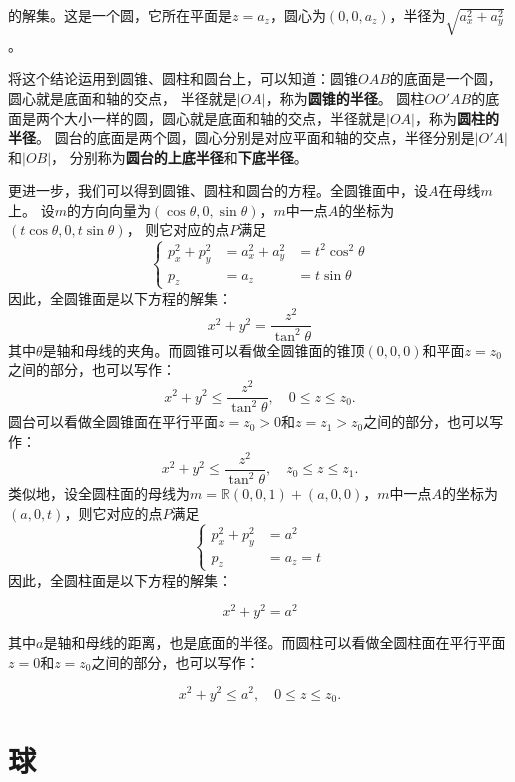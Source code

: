 \documentclass[12pt,UTF8]{ctexbook}
\begin{document}
的解集。这是一个圆，它所在平面是$z=a_z$，圆心为$(0,0,a_z)$，半径为$\sqrt{a_x^2+a_y^2}$。

将这个结论运用到圆锥、圆柱和圆台上，可以知道：圆锥$OAB$的底面是一个圆，圆心就是底面和轴的交点，
半径就是$|OA|$，称为\textbf{圆锥的半径}。
圆柱$OO'AB$的底面是两个大小一样的圆，圆心就是底面和轴的交点，半径就是$|OA|$，称为\textbf{圆柱的半径}。
圆台的底面是两个圆，圆心分别是对应平面和轴的交点，半径分别是$|O'A|$和$|OB|$，
分别称为\textbf{圆台的上底半径}和\textbf{下底半径}。

更进一步，我们可以得到圆锥、圆柱和圆台的方程。全圆锥面中，设$A$在母线$m$上。
设$m$的方向向量为$(\cos{\theta}, 0, \sin{\theta})$，$m$中一点$A$的坐标为$(t\cos{\theta}, 0, t\sin{\theta})$，
则它对应的点$P$满足
$$
\left\{
\begin{array}{rll}
    p_x^2+p_y^2 &= a_x^2+a_y^2 &= t^2\cos^2{\theta} \\
    p_z &= a_z &= t\sin{\theta}
\end{array}
\right.
$$
因此，全圆锥面是以下方程的解集：
$$ x^2 + y^2 = \frac{z^2}{\tan^2{\theta}}$$
其中$\theta$是轴和母线的夹角。而圆锥可以看做全圆锥面的锥顶$( 0,0,0)$和平面$z=z_0$之间的部分，也可以写作：
$$ x^2 + y^2 \leqslant \frac{z^2}{\tan^2{\theta}} , \quad 0\leqslant z \leqslant z_0.$$
圆台可以看做全圆锥面在平行平面$z=z_0>0$和$z=z_1 > z_0$之间的部分，也可以写作：
$$ x^2 + y^2 \leqslant \frac{z^2}{\tan^2{\theta}} , \quad z_0\leqslant z \leqslant z_1.$$
类似地，设全圆柱面的母线为$m = \mathbb{R}(0,0,1)+(a,0,0)$，$m$中一点$A$的坐标为$(a, 0, t)$，则它对应的点$P$满足
$$
\left\{
\begin{array}{rl}
    p_x^2+p_y^2 &= a^2 \\
    p_z &= a_z = t
\end{array}
\right.
$$
因此，全圆柱面是以下方程的解集：

$$ x^2 + y^2 = a^2$$

其中$a$是轴和母线的距离，也是底面的半径。而圆柱可以看做全圆柱面在平行平面$z=0$和$z=z_0$之间的部分，也可以写作：

$$ x^2 + y^2 \leqslant a^2 , \quad 0\leqslant z \leqslant z_0.$$


\section{球}
\end{document}
